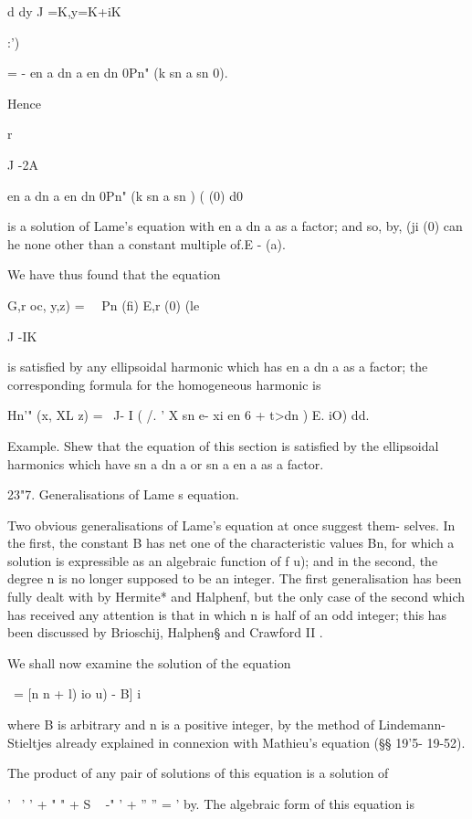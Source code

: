 {{{{{{{{d dy J =K,y=K+iK

:')

= - en a dn a en dn 0Pn" (k sn a sn 0).

Hence

r

J -2A

en a dn a en dn 0Pn" (k sn a sn ) ( (0) d0

is a solution of Lame's equation with en a dn a as a factor; and so,
by, (ji (0) can he none other than a constant multiple of.E -
(a).

%
%

We have thus found that the equation

G,r oc, y,z) = \ \ Pn (fi) E,r (0) (le

J -IK

is satisfied by any ellipsoidal harmonic which has en a dn a as a
factor; the corresponding formula for the homogeneous harmonic is

Hn'" (x, XL z) = \ J- I ( /. ' X sn e- xi en 6 + t>dn ) E. iO) dd.

Example. Shew that the equation of this section is satisfied by the
ellipsoidal harmonics which have sn a dn a or sn a en a as a factor.

23"7. Generalisations of Lame s equation.

Two obvious generalisations of Lame's equation at once suggest them-
selves. In the first, the constant B has net one of the characteristic
values Bn, for which a solution is expressible as an algebraic
function of f u); and in the second, the degree n is no longer
supposed to be an integer. The first generalisation has been fully
dealt with by Hermite* and Halphenf, but the only case of the second
which has received any attention is that in which n is half of an odd
integer; this has been discussed by Brioschij, Halphen§ and Crawford
II .

We shall now examine the solution of the equation

 \ = [n n + l) io u) - B] i\,

where B is arbitrary and n is a positive integer, by the method of
Lindemann- Stieltjes already explained in connexion with Mathieu's
equation (§§ 19'5- 19-52).

The product of any pair of solutions of this equation is a solution of

'~ ' ' + " " + S ~ -" ' + '' '' = ' by. The algebraic form of
this equation is

}}}}}}}}
